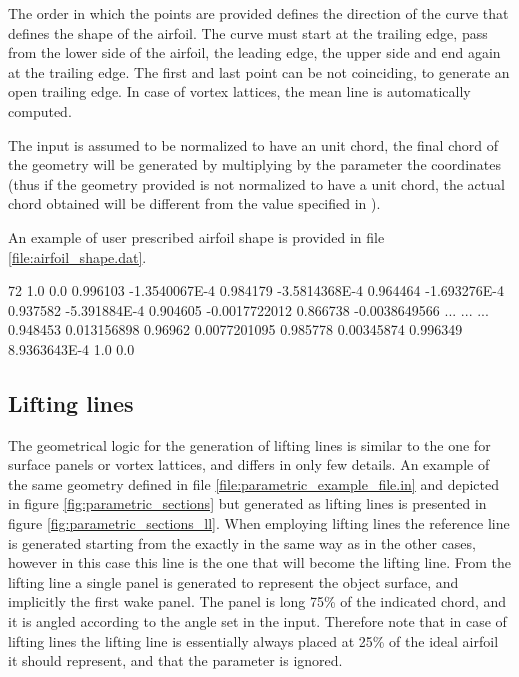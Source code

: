 The order in which the points are provided defines the direction of the curve that 
defines the shape of the airfoil. The curve must start at the trailing edge, 
pass from the lower side of the airfoil, the leading edge, the upper side and end 
again at the trailing edge. The first and last point can be not coinciding, 
to generate an open trailing edge. In case of vortex lattices, the mean line is 
automatically computed. 

The input is assumed to be normalized to have an unit chord, the final chord of 
the geometry will be generated by multiplying by the  parameter the coordinates 
(thus if the geometry provided is not normalized to have a unit chord, 
the actual chord obtained will be different from the value specified in ).

An example of user prescribed airfoil shape is provided in file \ref{file:airfoil_shape.dat}.

\begin{inputfile}[frame=single, caption={Example of user specified airfoil shape 
  (the middle lines have been suppressed for brevity)}, label={file:airfoil_shape.dat}]
72
1.0      0.0   
0.996103      -1.3540067E-4   
0.984179      -3.5814368E-4   
0.964464      -1.693276E-4   
0.937582      -5.391884E-4   
0.904605      -0.0017722012   
0.866738      -0.0038649566   
...
...
...
0.948453      0.013156898   
0.96962      0.0077201095   
0.985778      0.00345874   
0.996349      8.9363643E-4   
1.0      0.0   
\end{inputfile}

\subsection{Lifting lines}

The geometrical logic for the generation of lifting lines is similar to the one for surface panels 
or vortex lattices, and differs in only few details. An example of the same geometry defined in 
file \ref{file:parametric_example_file.in} and depicted in figure \ref{fig:parametric_sections} 
but generated as lifting lines is presented in figure \ref{fig:parametric_sections_ll}. 
When employing lifting lines the reference line is generated starting from the 
 exactly in the same way as in the other cases, however 
in this case this line is the one that will become the lifting line. From the lifting 
line a single panel is generated to represent the object surface, and implicitly the 
first wake panel. The panel is long 75\% of the indicated chord, and it is angled according 
to the  angle set in the input. Therefore note that in case of lifting lines the 
lifting line is essentially always placed at 25\% of the ideal airfoil it should represent, 
and that the parameter  is ignored. 

